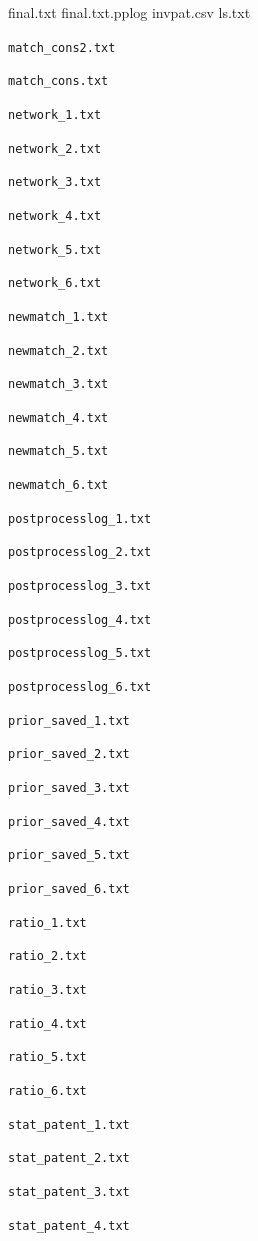\documentclass{article}
\begin{document}
final.txt
final.txt.pplog
invpat.csv
ls.txt
\item \texttt{match\_cons2.txt}
\item \texttt{match\_cons.txt}
\item \texttt{network\_1.txt}
\item \texttt{network\_2.txt}
\item \texttt{network\_3.txt}
\item \texttt{network\_4.txt}
\item \texttt{network\_5.txt}
\item \texttt{network\_6.txt}
\item \texttt{newmatch\_1.txt}
\item \texttt{newmatch\_2.txt}
\item \texttt{newmatch\_3.txt}
\item \texttt{newmatch\_4.txt}
\item \texttt{newmatch\_5.txt}
\item \texttt{newmatch\_6.txt}
\item \texttt{postprocesslog\_1.txt}
\item \texttt{postprocesslog\_2.txt}
\item \texttt{postprocesslog\_3.txt}
\item \texttt{postprocesslog\_4.txt}
\item \texttt{postprocesslog\_5.txt}
\item \texttt{postprocesslog\_6.txt}
\item \texttt{prior\_saved\_1.txt}
\item \texttt{prior\_saved\_2.txt}
\item \texttt{prior\_saved\_3.txt}
\item \texttt{prior\_saved\_4.txt}
\item \texttt{prior\_saved\_5.txt}
\item \texttt{prior\_saved\_6.txt}
\item \texttt{ratio\_1.txt}
\item \texttt{ratio\_2.txt}
\item \texttt{ratio\_3.txt}
\item \texttt{ratio\_4.txt}
\item \texttt{ratio\_5.txt}
\item \texttt{ratio\_6.txt}
\item \texttt{stat\_patent\_1.txt}
\item \texttt{stat\_patent\_2.txt}
\item \texttt{stat\_patent\_3.txt}
\item \texttt{stat\_patent\_4.txt}
\end{document}
